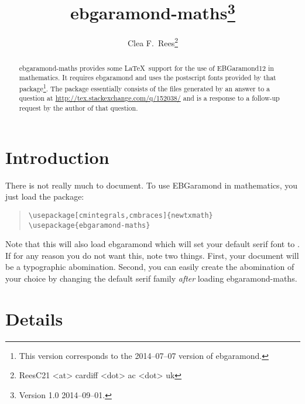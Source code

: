 \documentclass[12pt,british,a4paper]{article}
\title{ebgaramond-maths\thanks{Version 1.0 2014--09--01.}}
\author{Clea F.\ Rees\footnote{\liningfam ReesC21 <at> cardiff <dot> ac <dot> uk}}
\date{\dyddiad}
\makeatletter
\DeclareRobustCommand{\liningfam}{\fontfamily{EBGaramond-\ebgaramond@figurealign LF}\selectfont}
\makeatother
\begin{document}
\maketitle\thispagestyle{empty}

\newcommand*{\lpack}[1]{\textsf{#1}}

\begin{abstract}
  \liningfam
  \noindent\lpack{ebgaramond-maths} provides some \LaTeX\ support for the use of EBGaramond12 in mathematics.
  It requires \lpack{ebgaramond} and uses the postscript fonts provided by that package\footnote{This version corresponds to the 2014--07--07 version of \lpack{ebgaramond}.}.
  The package essentially consists of the files generated by an answer to a question at \url{http://tex.stackexchange.com/q/152038/} and is a response to a follow-up request by the author of that question.
\end{abstract}

\section{Introduction}\label{sec:intro}
There is not really much to document.
To use EBGaramond in mathematics, you just load the package:
\begin{quote}
\begin{verbatim}
\usepackage[cmintegrals,cmbraces]{newtxmath}
\usepackage{ebgaramond-maths}
\end{verbatim}
\end{quote}
Note that this will also load \lpack{ebgaramond} which will set your default serif font to .
If for any reason you do not want this, note two things.
First, your document will be a typographic abomination.
Second, you can easily create the abomination of your choice by changing the default serif family \emph{after} loading \lpack{ebgaramond-maths}.

\section{Details}\label{sec:manylion}
\end{document}
